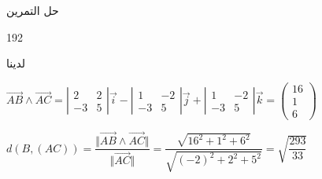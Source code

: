 \begin{frame}[fragile,label=sol4]{حل التمرين} 
	\begin{block}{} 
			\begin{dingautolist}{192}
				\item
				لدينا 
				
				$ 	 \overrightarrow{AB} \land \overrightarrow{AC}=\left |\begin{array}{cc} 2&2\\-3&5\end{array}\right |\vec{i}- \left |\begin{array}{cc}1&-2\\-3&5\end{array}\right |\vec{j}+ \left |\begin{array}{cc}  1&-2\\-3&5\end{array}\right |\vec{k}
			= \begin{pmatrix}16\\1\\6\end{pmatrix} $
					\item 
					$d(B,(AC))=\dfrac{\Vert \overrightarrow{AB} \wedge \overrightarrow{AC}\Vert}{\Vert \overrightarrow{AC} \Vert}=\dfrac{\sqrt{16^2+1^2+6^2}}{\sqrt{(-2)^2+2^2+5^2}}=\sqrt{\dfrac{293}{33}}$ 	
			\end{dingautolist} 
			\hyperlink{ex4}{}
	\end{block}
\end{frame}
